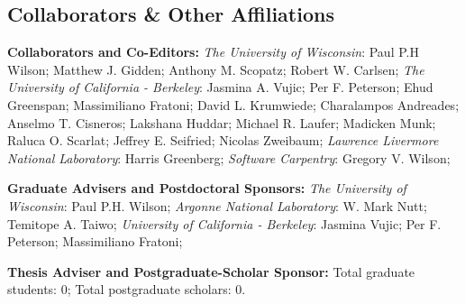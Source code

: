 \documentclass[svgnames,11pt]{article}
\begin{document}
\subsection{Collaborators \& Other Affiliations}

\begin{bibsection}
    \item \textbf{Collaborators and Co-Editors:}
      \emph{The University of Wisconsin}:
            Paul P.H Wilson;
            Matthew J. Gidden;
            Anthony M. Scopatz;
            Robert W. Carlsen;
      \emph{The University of California - Berkeley}:
            Jasmina A. Vujic;
            Per F. Peterson;
            Ehud Greenspan;
            Massimiliano Fratoni;
            David L. Krumwiede;
            Charalampos Andreades;
            Anselmo T. Cisneros;
            Lakshana Huddar;
            Michael R. Laufer;
            Madicken Munk;
            Raluca O. Scarlat;
            Jeffrey E. Seifried;
            Nicolas Zweibaum;
      \emph{Lawrence Livermore National Laboratory}:
            Harris Greenberg;
      \emph{Software Carpentry}:
            Gregory V. Wilson;
    \item \textbf{Graduate Advisers and Postdoctoral Sponsors:}
        \emph{The University of Wisconsin}:
            Paul P.H. Wilson;
        \emph{Argonne National Laboratory}:
            W. Mark Nutt;
            Temitope A. Taiwo;
        \emph{University of California - Berkeley}:
            Jasmina Vujic;
            Per F. Peterson;
            Massimiliano Fratoni;
    \item \textbf{Thesis Adviser and Postgraduate-Scholar Sponsor:}
        Total graduate students: 0; Total postgraduate scholars: 0.

\end{bibsection}
\end{document}
